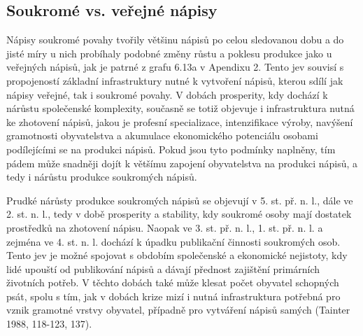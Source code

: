 \subsection[soukromé-vs.-veřejné-nápisy]{Soukromé vs. veřejné nápisy}

Nápisy soukromé povahy tvořily většinu nápisů po celou sledovanou dobu a do jisté míry u nich probíhaly podobné změny růstu a poklesu produkce jako u veřejných nápisů, jak je patrné z grafu 6.13a v Apendixu 2. Tento jev souvisí s propojeností základní infrastruktury nutné k vytvoření nápisů, kterou sdílí jak nápisy veřejné, tak i soukromé povahy. V dobách prosperity, kdy dochází k nárůstu společenské komplexity, současně se totiž objevuje i infrastruktura nutná ke zhotovení nápisů, jakou je profesní specializace, intenzifikace výroby, navýšení gramotnosti obyvatelstva a akumulace ekonomického potenciálu osobami podílejícími se na produkci nápisů. Pokud jsou tyto podmínky naplněny, tím pádem může snadněji dojít k většímu zapojení obyvatelstva na produkci nápisů, a tedy i nárůstu produkce soukromých nápisů.

Prudké nárůsty produkce soukromých nápisů se objevují v 5. st. př. n. l., dále ve 2. st. n. l., tedy v době prosperity a stability, kdy soukromé osoby mají dostatek prostředků na zhotovení nápisu. Naopak ve 3. st. př. n. l., 1. st. př. n. l. a zejména ve 4. st. n. l. dochází k úpadku publikační činnosti soukromých osob. Tento jev je možné spojovat s obdobím společenské a ekonomické nejistoty, kdy lidé upouští od publikování nápisů a dávají přednost zajištění primárních životních potřeb. V těchto dobách také může klesat počet obyvatel schopných psát, spolu s tím, jak v dobách krize mizí i nutná infrastruktura potřebná pro vznik gramotné vrstvy obyvatel, případně pro vytváření nápisů samých (Tainter 1988, 118-123, 137).

